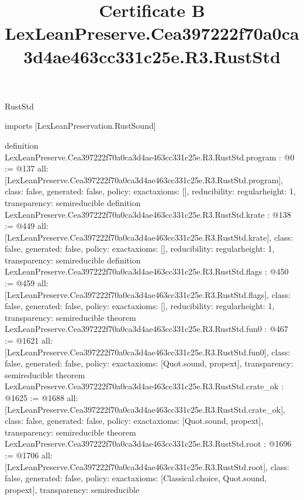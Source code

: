 \begin{lexlean}{RustStd}
\title{Certificate B LexLeanPreserve.Cea397222f70a0ca3d4ae463cc331c25e.R3.RustStd}
\begin{coremodule}
imports [LexLeanPreservation.RustSound]

definition LexLeanPreserve.Cea397222f70a0ca3d4ae463cc331c25e.R3.RustStd.program : @0 := @137 {
  all: [LexLeanPreserve.Cea397222f70a0ca3d4ae463cc331c25e.R3.RustStd.program],
  class: false,
  generated: false,
  policy: exact{axioms: []},
  reducibility: regular{height: 1},
  transparency: semireducible
}
definition LexLeanPreserve.Cea397222f70a0ca3d4ae463cc331c25e.R3.RustStd.krate : @138 := @449 {
  all: [LexLeanPreserve.Cea397222f70a0ca3d4ae463cc331c25e.R3.RustStd.krate],
  class: false,
  generated: false,
  policy: exact{axioms: []},
  reducibility: regular{height: 1},
  transparency: semireducible
}
definition LexLeanPreserve.Cea397222f70a0ca3d4ae463cc331c25e.R3.RustStd.flags : @450 := @459 {
  all: [LexLeanPreserve.Cea397222f70a0ca3d4ae463cc331c25e.R3.RustStd.flags],
  class: false,
  generated: false,
  policy: exact{axioms: []},
  reducibility: regular{height: 1},
  transparency: semireducible
}
theorem LexLeanPreserve.Cea397222f70a0ca3d4ae463cc331c25e.R3.RustStd.fun0 : @467 := @1621 {
  all: [LexLeanPreserve.Cea397222f70a0ca3d4ae463cc331c25e.R3.RustStd.fun0],
  class: false,
  generated: false,
  policy: exact{axioms: [Quot.sound, propext]},
  transparency: semireducible
}
theorem LexLeanPreserve.Cea397222f70a0ca3d4ae463cc331c25e.R3.RustStd.crate_ok : @1625 := @1688 {
  all: [LexLeanPreserve.Cea397222f70a0ca3d4ae463cc331c25e.R3.RustStd.crate_ok],
  class: false,
  generated: false,
  policy: exact{axioms: [Quot.sound, propext]},
  transparency: semireducible
}
theorem LexLeanPreserve.Cea397222f70a0ca3d4ae463cc331c25e.R3.RustStd.root : @1696 := @1706 {
  all: [LexLeanPreserve.Cea397222f70a0ca3d4ae463cc331c25e.R3.RustStd.root],
  class: false,
  generated: false,
  policy: exact{axioms: [Classical.choice, Quot.sound, propext]},
  transparency: semireducible
}


\end{coremodule}
\end{lexlean}
